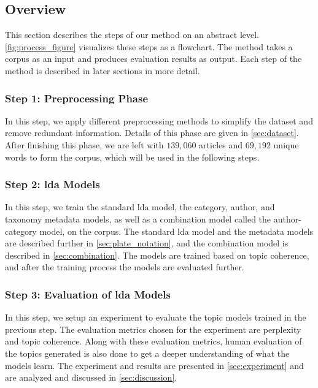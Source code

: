 \subsection{Overview}\label{sec:overview}
This section describes the steps of our method on an abstract level.
\autoref{fig:process_figure} visualizes these steps as a flowchart.
The method takes a corpus as an input and produces evaluation results as output.
Each step of the method is described in later sections in more detail.

\subsubsection*{Step 1: Preprocessing Phase}
In this step, we apply different preprocessing methods to simplify the dataset and remove redundant information.
Details of this phase are given in \autoref{sec:dataset}.
After finishing this phase, we are left with $139,060$ articles and $69,192$ unique words to form the corpus, which will be used in the following steps.

\subsubsection*{Step 2: \Gls{lda} Models}
In this step, we train the standard \gls{lda} model, the category, author, and taxonomy metadata models, as well as a combination model called the author-category model, on the corpus.
The standard \gls{lda} model and the metadata models are described further in \autoref{sec:plate_notation}, and the combination model is described in \autoref{sec:combination}.
The models are trained based on topic coherence, and after the training process the models are evaluated further.

\subsubsection*{Step 3: Evaluation of \gls{lda} Models}
In this step, we setup an experiment to evaluate the topic models trained in the previous step.
The evaluation metrics chosen for the experiment are perplexity and topic coherence.
Along with these evaluation metrics, human evaluation of the topics generated is also done to get a deeper understanding of what the models learn.
The experiment and results are presented in \autoref{sec:experiment} and are analyzed and discussed in \autoref{sec:discussion}.



